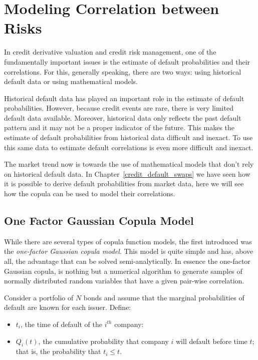 \chapter{Modeling Correlation between Risks}

In credit derivative valuation and credit risk management, one of the
fundamentally important issues is the estimate of default
probabilities and their correlations. For this, generally speaking,
there are two ways: using historical default data or using mathematical
models.

Historical default data has played an important role in the estimate
of default probabilities. However, because credit events are rare,
there is very limited default data available. Moreover, historical data only
reflects the past default pattern and it may not be a proper
indicator of the future. This makes the estimate of default
probabilities from historical data difficult and inexact. To use this
same data to estimate default correlations is even more difficult and
inexact.

The market trend now is towards the use of mathematical
models that don't rely on historical default data. In
Chapter~\ref{credit_default_swaps} we have seen how it is possible to derive default probabilities from market data,
here we will see how the copula can be used to model their correlations. 

\section{One Factor Gaussian Copula Model}
\label{standard-market-model}
While there are several types of copula function models, the first
introduced was the \emph{one-factor Gaussian copula model}. This model 
is quite simple and has, above all, the advantage that can be solved semi-analytically.
In essence the one-factor Gaussian copula, is nothing but a numerical algorithm to generate samples of normally distributed random variables that have a given
pair-wise correlation. 

Consider a portfolio of \(N\) bonds and assume that the marginal
probabilities of default are known for each issuer. Define:

\begin{itemize}
	\tightlist
	\item
	\(t_i\), the time of default of the \(i^{th}\) company:
	\item
	\(Q_i(t)\), the cumulative probability that company \(i\) will default
	before time \(t\); that is, the probability that \(t_i \le t\).
\end{itemize}

